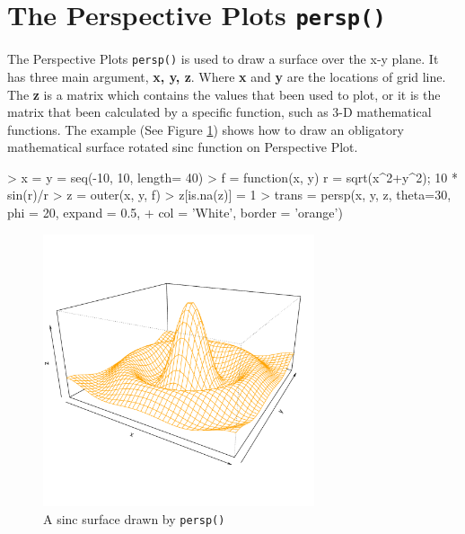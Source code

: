 \documentclass{report}
\begin{document}
\section{The Perspective Plots \texttt{persp()}}
The Perspective Plots \texttt{persp()} is used to draw a surface over the x-y plane.  
It has three main argument, \textbf{x, y, z}. Where \textbf{x} and \textbf{y} are the locations of grid line. The \textbf{z} is a matrix which contains the values that been used to plot, or it is the matrix that been calculated by a specific function, such as 3-D mathematical functions. The example (See Figure \ref{figure_3.1}) shows how to draw an obligatory mathematical surface rotated sinc function on Perspective Plot.
\begin{Schunk}
\begin{Sinput}
> x = y = seq(-10, 10, length= 40)
> f = function(x, y) { r = sqrt(x^2+y^2); 10 * sin(r)/r }
> z = outer(x, y, f)
> z[is.na(z)] = 1
> trans = persp(x, y, z, theta=30, phi = 20, expand = 0.5,
+               col = 'White', border = 'orange')
\end{Sinput}
\end{Schunk}
\begin{figure}[h!]
	\begin{center}
		\includegraphics[height = 8cm, width = 8cm]{figure/standalone_1.pdf}
		\caption{A sinc surface drawn by \texttt{persp()}}
		\label{figure_3.1}
	\end{center}
\end{figure}
\end{document}
